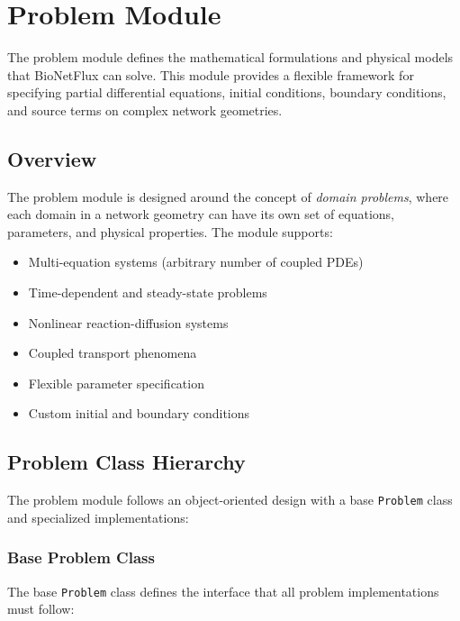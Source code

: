 
\section{Problem Module}
\label{sec:problem_module}

The problem module defines the mathematical formulations and physical models that BioNetFlux can solve. This module provides a flexible framework for specifying partial differential equations, initial conditions, boundary conditions, and source terms on complex network geometries.

\subsection{Overview}
\label{subsec:problem_overview}

The problem module is designed around the concept of \emph{domain problems}, where each domain in a network geometry can have its own set of equations, parameters, and physical properties. The module supports:

\begin{itemize}
	\item Multi-equation systems (arbitrary number of coupled PDEs)
	\item Time-dependent and steady-state problems
	\item Nonlinear reaction-diffusion systems
	\item Coupled transport phenomena
	\item Flexible parameter specification
	\item Custom initial and boundary conditions
\end{itemize}

\subsection{Problem Class Hierarchy}
\label{subsec:problem_hierarchy}

The problem module follows an object-oriented design with a base \texttt{Problem} class and specialized implementations:

\subsubsection{Base Problem Class}

The base \texttt{Problem} class defines the interface that all problem implementations must follow:

